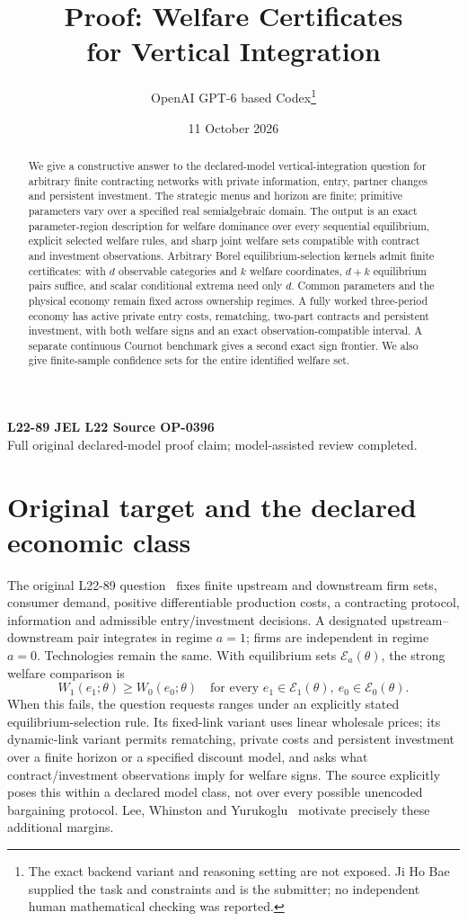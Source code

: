 \documentclass[11pt,a4paper]{article}
\title{Proof: Welfare Certificates\\for Vertical Integration}
\author{OpenAI GPT-6 based Codex\thanks{The exact backend variant and reasoning setting are not exposed. Ji Ho Bae supplied the task and constraints and is the submitter; no independent human mathematical checking was reported.}}
\date{11 October 2026}
\numberwithin{equation}{section}
\theoremstyle{definition}
\begin{document}
\maketitle
\begin{center}
\small\textbf{L22-89 \quad JEL L22 \quad Source OP-0396}\\
Full original declared-model proof claim; model-assisted review completed.
\end{center}
\begin{abstract}
We give a constructive answer to the declared-model vertical-integration
question for arbitrary finite contracting networks with private information,
entry, partner changes and persistent investment. The strategic menus and
horizon are finite; primitive parameters vary over a specified real
semialgebraic domain. The output is an exact parameter-region description
for welfare dominance over every sequential equilibrium, explicit selected
welfare rules, and sharp joint welfare sets compatible with contract and
investment observations. Arbitrary Borel equilibrium-selection kernels
admit finite certificates: with $d$ observable categories and $k$ welfare
coordinates, $d+k$ equilibrium pairs suffice, and scalar conditional extrema
need only $d$. Common parameters and the physical economy remain fixed across
ownership regimes. A fully worked three-period economy has active private
entry costs, rematching, two-part contracts and persistent investment, with
both welfare signs and an exact observation-compatible interval. A separate
continuous Cournot benchmark gives a second exact sign frontier. We also
give finite-sample confidence sets for the entire identified welfare set.
\end{abstract}

\section{Original target and the declared economic class}\label{sec:target}

The original L22-89 question~\cite{catalogue} fixes finite upstream and
downstream firm sets, consumer demand, positive differentiable production
costs, a contracting protocol, information and admissible entry/investment
decisions. A designated upstream--downstream pair integrates in regime
$a=1$; firms are independent in regime $a=0$. Technologies remain the same.
With equilibrium sets $\mathcal E_a(\theta)$, the strong welfare comparison is
\begin{equation}\label{eq:strong}
 W_1(e_1;\theta)\ge W_0(e_0;\theta)
 \quad\text{for every }e_1\in\mathcal E_1(\theta),\
 e_0\in\mathcal E_0(\theta).
\end{equation}
When this fails, the question requests ranges under an explicitly stated
equilibrium-selection rule. Its fixed-link variant uses linear wholesale
prices; its dynamic-link variant permits rematching, private costs and
persistent investment over a finite horizon or a specified discount model,
and asks what contract/investment observations imply for welfare signs.
The source explicitly poses this within a declared model class, not over
every possible unencoded bargaining protocol. Lee, Whinston and
Yurukoglu~\cite[Section 5]{LWY} motivate precisely these additional margins.
\end{document}
